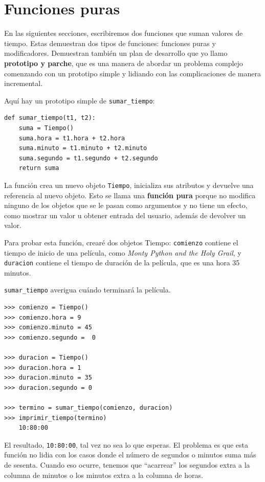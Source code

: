 \documentclass[10pt]{book}
\begin{document}
\section{Funciones puras}

En las siguientes secciones, escribiremos dos funciones que suman valores de
tiempo.  Estas demuestran dos tipos de funciones: funciones puras y
modificadores.  Demuestran también un plan de desarrollo que yo llamo {\bf
  prototipo y parche}, que es una manera de abordar un problema complejo
comenzando con un prototipo simple y lidiando con las complicaciones
de manera incremental.

Aquí hay un prototipo simple de \verb"sumar_tiempo":

\begin{verbatim}
def sumar_tiempo(t1, t2):
    suma = Tiempo()
    suma.hora = t1.hora + t2.hora
    suma.minuto = t1.minuto + t2.minuto
    suma.segundo = t1.segundo + t2.segundo
    return suma
\end{verbatim}
%
La función crea un nuevo objeto {\tt Tiempo}, inicializa sus
atributos y devuelve una referencia al nuevo objeto.  Esto se llama
una {\bf función pura} porque no modifica ninguno de los objetos
que se le pasan como argumentos y no tiene un efecto,
como mostrar un valor u obtener entrada del usuario,
además de devolver un valor.

Para probar esta función, crearé dos objetos Tiempo: {\tt comienzo}
contiene el tiempo de inicio de una película, como {\em Monty Python and the
Holy Grail}, y {\tt duracion} contiene el tiempo de duración de la película,
que es una hora 35 minutos.

\verb"sumar_tiempo" averigua cuándo terminará la película.

\begin{verbatim}
>>> comienzo = Tiempo()
>>> comienzo.hora = 9
>>> comienzo.minuto = 45
>>> comienzo.segundo =  0

>>> duracion = Tiempo()
>>> duracion.hora = 1
>>> duracion.minuto = 35
>>> duracion.segundo = 0

>>> termino = sumar_tiempo(comienzo, duracion)
>>> imprimir_tiempo(termino)
    10:80:00
\end{verbatim}
%
El resultado, {\tt 10:80:00}, tal vez no sea lo que
esperas.  El problema es que esta función no lidia con los casos donde el
número de segundos o minutos suma más de sesenta.  Cuando eso
ocurre, tenemos que ``acarrear'' los segundos extra a la columna de minutos
o los minutos extra a la columna de horas.
\end{document}
